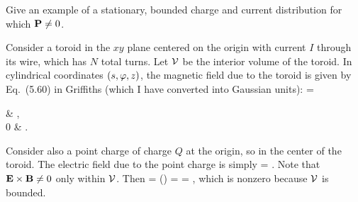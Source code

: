 \clearpage
\begin{problem}
	Give an example of a stationary, bounded charge and current distribution for which $\vb{P} \neq 0$.
\end{problem}

\begin{solution}
	Consider a toroid in the $xy$ plane centered on the origin with current $I$ through its wire, which has $N$ total turns.  Let $\mathcal{V}$ be the interior volume of the toroid.  In cylindrical coordinates $(s, \varphi, z)$, the magnetic field due to the toroid is given by Eq.~(5.60) in Griffiths (which I have converted into Gaussian units):
	\beq
		\vBx = \begin{cases}
			 \phh & \vx \in \cV, \\[2ex]
			0 & \vx \not\in \cV.
		\end{cases}
	\eeq
	Consider also a point charge of charge $Q$ at the origin, so in the center of the toroid.  The electric field due to the point charge is simply
	\beq
		\vE =  \rh.
	\eeq
	Note that $\vb{E} \times \vb{B} \neq 0$ only within $\mathcal{V}$.  Then
	\beq
		\vP =  \int (\vE \times \vB) \dcx
		=  \intcV {} \dcx
		=  \zh \intcV {},
	\eeq
	which is nonzero because $\mathcal{V}$ is bounded.
\end{solution}